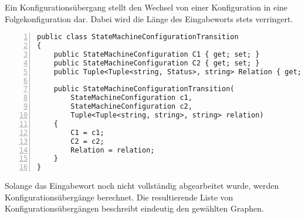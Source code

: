 Ein Konfigurationsübergang stellt den Wechsel von einer Konfiguration in eine Folgekonfiguration dar. Dabei wird die Länge des Eingabeworts stets verringert.

\begin{lstlisting}[language={[Sharp]C}, breaklines=true, tabsize=2, showstringspaces=false, frame=single, numbers=left, basicstyle=\small] 
public class StateMachineConfigurationTransition
{
	public StateMachineConfiguration C1 { get; set; }
	public StateMachineConfiguration C2 { get; set; }
	public Tuple<Tuple<string, Status>, string> Relation { get; set; }
	
	public StateMachineConfigurationTransition(
		StateMachineConfiguration c1, 
		StateMachineConfiguration c2, 
		Tuple<Tuple<string, string>, string> relation)
	{
		C1 = c1;
		C2 = c2;
		Relation = relation;
	}
}
\end{lstlisting}

Solange das Eingabewort noch nicht vollständig abgearbeitet wurde, werden Konfigurationsübergänge berechnet. Die resultierende Liste von Konfigurationsübergängen beschreibt eindeutig den gewählten Graphen. 

